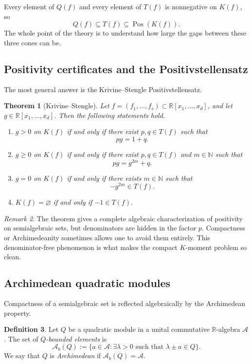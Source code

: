 \documentclass[11pt]{amsart}
\numberwithin{equation}{section}
\newtheorem{theorem}{Theorem}[section]
\theoremstyle{definition}
\newtheorem{definition}[theorem]{Definition}
\theoremstyle{remark}
\newtheorem{remark}[theorem]{Remark}
\newcommand{\R}{\mathbb{R}}
\newcommand{\N}{\mathbb{N}}
\newcommand{\Acal}{\mathcal{A}}
\newcommand{\Rxd}{\R[x_1,\dots,x_d]}
\newcommand{\Pos}{\operatorname{Pos}}
\newcommand{\1}{\mathbf{1}}
\begin{document}
Every element of \(Q(f)\) and every element of \(T(f)\) is nonnegative on \(K(f)\), so
\[
Q(f)\subseteq T(f)\subseteq \Pos(K(f)).
\]
The whole point of the theory is to understand how large the gaps between these three cones can be.

\subsection{Positivity certificates and the Positivstellensatz}

The most general answer is the Krivine--Stengle Positivstellensatz.

\begin{theorem}[Krivine--Stengle]\label{thm:ks}
Let \(f=(f_1,\dots,f_s)\subset \Rxd\), and let \(g\in\Rxd\). Then the following statements hold.
\begin{enumerate}[label=\textup{(\arabic*)}, leftmargin=2em]
\item \(g>0\) on \(K(f)\) if and only if there exist \(p,q\in T(f)\) such that
\[
pg=1+q.
\]
\item \(g\ge 0\) on \(K(f)\) if and only if there exist \(p,q\in T(f)\) and \(m\in\N\) such that
\[
pg=g^{2m}+q.
\]
\item \(g=0\) on \(K(f)\) if and only if there exists \(m\in\N\) such that
\[
-g^{2m}\in T(f).
\]
\item \(K(f)=\varnothing\) if and only if \(-1\in T(f)\).
\end{enumerate}
\end{theorem}

\begin{remark}
The theorem gives a complete algebraic characterization of positivity on semialgebraic sets, but denominators are hidden in the factor \(p\). Compactness or Archimedeanity sometimes allows one to avoid them entirely. This denominator-free phenomenon is what makes the compact \(K\)-moment problem so clean.
\end{remark}

\subsection{Archimedean quadratic modules}

Compactness of a semialgebraic set is reflected algebraically by the Archimedean property.

\begin{definition}
Let \(Q\) be a quadratic module in a unital commutative \(\R\)-algebra \(\Acal\). The set of \emph{\(Q\)-bounded elements} is
\[
\Acal_b(Q):=\{a\in\Acal: \exists \lambda>0\text{ such that }\lambda\pm a\in Q\}.
\]
We say that \(Q\) is \emph{Archimedean} if \(\Acal_b(Q)=\Acal\).
\end{definition}
\end{document}

